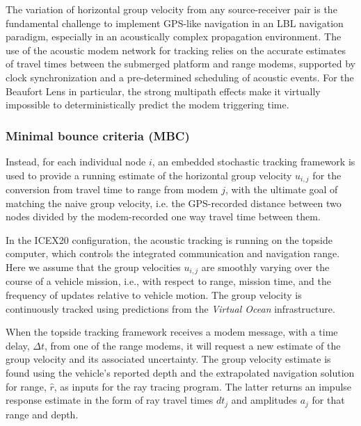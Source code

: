 The variation of horizontal group velocity from any source-receiver pair is the fundamental challenge to implement GPS-like navigation in an LBL navigation paradigm, especially in an acoustically complex propagation environment.
The use of the acoustic modem network for tracking relies on the accurate estimates of travel times between the submerged platform and range modems, supported by clock synchronization and a pre-determined scheduling of acoustic events.
For the Beaufort Lens in particular, the strong multipath effects make it virtually impossible to deterministically predict the modem triggering time.

\subsubsection{Minimal bounce criteria (MBC)}
Instead, for each individual node $i$, an embedded stochastic tracking framework is used to provide a running estimate of the horizontal group velocity $u_{i,j}$ for the conversion from travel time to range from modem $j$, with the ultimate goal of matching the naive group velocity, i.e. the GPS-recorded distance between two nodes divided by the modem-recorded one way travel time between them. 

In the ICEX20 configuration, the acoustic tracking is running on the topside computer, which controls the integrated communication and navigation range.
Here we assume that the group velocities $u_{i,j}$ are smoothly varying over the course of a vehicle mission, i.e., with respect to range, mission time, and the frequency of updates relative to vehicle motion. 
The group velocity is continuously tracked using predictions from the \textit{Virtual Ocean} infrastructure.

When the topside tracking framework receives a modem message, with a time delay, $\Delta t$, from one of the range modems, it will request a new estimate of the group velocity and its associated uncertainty.
The group velocity estimate is found using the vehicle's reported depth and the extrapolated navigation solution for range, $\hat{r}$, as inputs for the ray tracing program. The latter returns an impulse response estimate in the form of ray travel times $dt_{j}$ and amplitudes $a_{j}$ for that range and depth.

